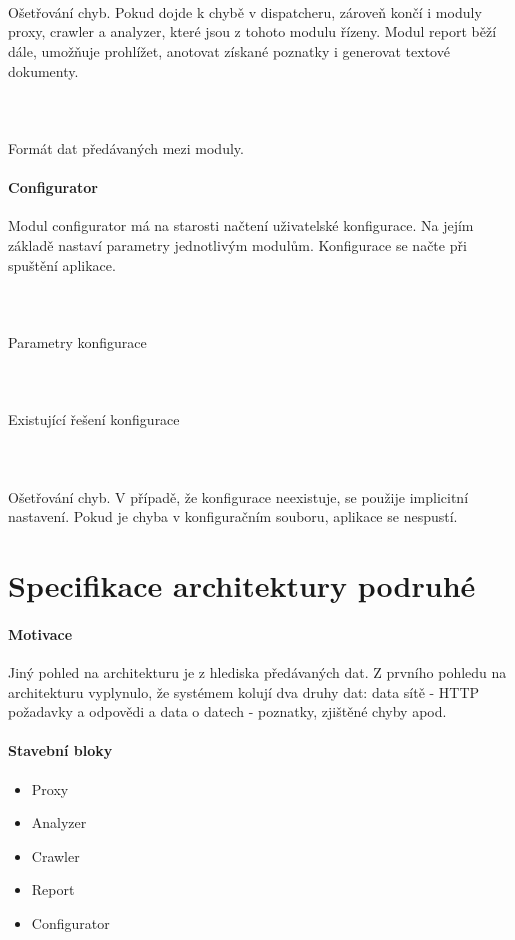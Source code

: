 \documentclass[10pt]{article}
\begin{document}
\paragraph{~} Ošetřování chyb. Pokud dojde k chybě v dispatcheru, zároveň končí i moduly proxy, crawler a analyzer, které jsou z tohoto modulu řízeny. Modul report běží dále, umožňuje prohlížet, anotovat získané poznatky i generovat textové dokumenty.
\paragraph{~} Formát dat předávaných mezi moduly.
\paragraph{Configurator} Modul configurator má na starosti načtení uživatelské konfigurace. Na jejím základě nastaví parametry jednotlivým modulům.  Konfigurace se načte při spuštění aplikace.
\paragraph{~}Parametry konfigurace
\paragraph{~}Existující řešení konfigurace
\paragraph{~}Ošetřování chyb. V případě, že konfigurace neexistuje, se použije implicitní nastavení. Pokud je chyba v konfiguračním souboru, aplikace se nespustí.
\section{Specifikace architektury podruh\'e}
\paragraph{Motivace} Jin\'y pohled na architekturu je z hlediska p\v{r}ed\'avan\'ych dat. Z prvn\'iho pohledu na architekturu vyplynulo, \v{z}e syst\'emem koluj\'i dva druhy dat: data s\'it\v{e} - HTTP po\v{z}adavky a odpov\v{e}di a data o datech - poznatky, zji\v{s}t\v{e}n\'e chyby apod.
\paragraph{Stavebn\'i bloky}
\begin{itemize}
	\item Proxy
	\item Analyzer
	\item Crawler
	\item Report
	\item Configurator
\end{itemize}
\end{document}
